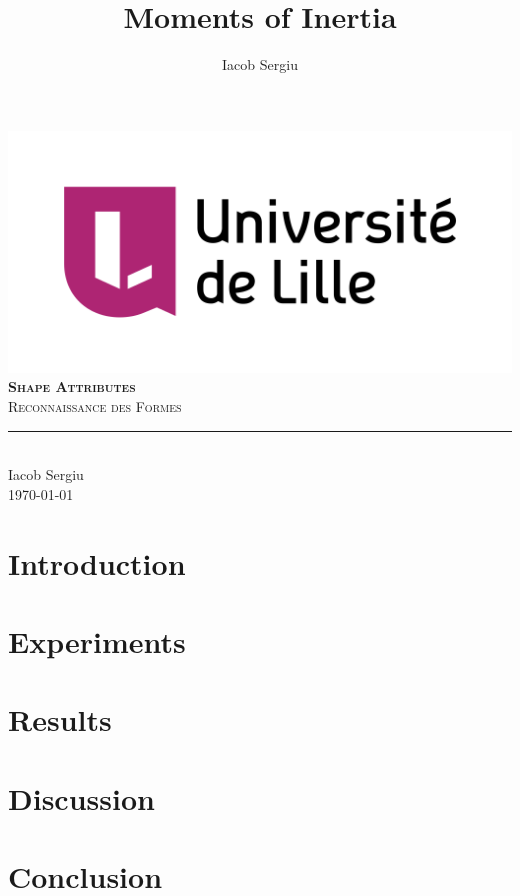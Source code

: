 \documentclass[11pt,titlepage]{report}
\author{Iacob Sergiu}
\title{Moments of Inertia}
\begin{document}
\begin{titlepage}
	\centering
    \includegraphics[width=0.75\linewidth]{images/universite_de_lille.png}\\[0.25cm] 	%
    \vspace{\fill}
    \textbf{\textsc{\fontsize{50}{50}\selectfont Shape Attributes}}\\ \vspace{\fill}		
	\textsc{\LARGE Reconnaissance des Formes}\\[0.4cm]
	\rule{\linewidth}{0.2 mm} \\[0.5 cm]
	Iacob Sergiu \\[2cm]
	\today
\end{titlepage}
\restoregeometry








\chapter{Introduction}


\chapter{Experiments}


\chapter{Results}


\chapter{Discussion}


\chapter{Conclusion}


\clearpage
\pagestyle{numberonly}
\printbibliography
\end{document}
